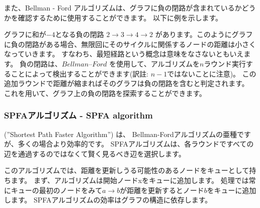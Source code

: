 また、Bellman - Ford アルゴリズムは、グラフに負の閉路が含まれているかどうかを確認するために使用することができます。
以下に例を示します。
\begin{center}
\end{center}
\noindent
グラフに和が$-4$となる負の閉路
$2 \rightarrow 3 \rightarrow 4 \rightarrow 2$
があります。このようにグラフに負の閉路がある場合、無限回にそのサイクルに関係するノードの距離は小さくなっていきます。
すなわち、最短経路という概念は意味をなさないともいえます。
負の閉路は、$Bellman–Ford$ を使用して、アルゴリズムを$n$ラウンド実行することによって検出することができます(訳註: $n-1$ではないことに注意)。
この追加ラウンドで距離が縮まればそのグラフは負の閉路を含むと判定されます。
これを用いて、グラフ上の負の閉路を探索することができます。

\subsubsection{SPFAアルゴリズム - SPFA algorithm}


 (''Shortest Path Faster Algorithm'') \cite{fan94}は、
Bellman-Fordアルゴリズムの亜種ですが、多くの場合より効率的です。
SPFAアルゴリズムは、各ラウンドですべての辺を通過するのではなくて賢く見るべき辺を選択します。

このアルゴリズムでは、距離を更新しうる可能性のあるノードをキューとして持ちます。
まず、アルゴリズムは開始ノードxをキューに追加します。
処理では常にキューの最初のノードをみて$a \rightarrow b$が距離を更新するとノード$b$をキューに追加します。
SPFAアルゴリズムの効率はグラフの構造に依存します。


%
%

